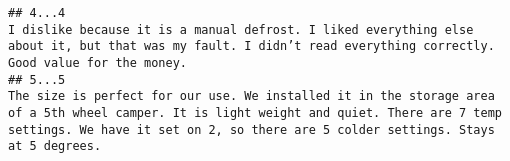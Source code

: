 \documentclass[
  11pt,
]{article}
\begin{document}
\begin{verbatim}
## 4...4                                                                                                                                                                                                                                                                                                                                                                                                                                                                                                                                                                                                                                                                                                                                                                                                                                                                                                                                                                                                                                                                                                                                                                                                                                                                                                                    I dislike because it is a manual defrost. I liked everything else about it, but that was my fault. I didn’t read everything correctly.  Good value for the money.
## 5...5                                                                                                                                                                                                                                                                                                                                                                                                                                                                                                                                                                                                                                                                                                                                                                                                                                                                                                                                                                                                                                                                                                                                                                                                                                                        The size is perfect for our use. We installed it in the storage area of a 5th wheel camper. It is light weight and quiet. There are 7 temp settings. We have it set on 2, so there are 5 colder settings. Stays at 5 degrees.

\end{verbatim}
\end{document}
